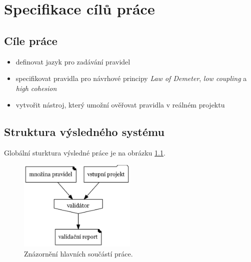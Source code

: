 \chapter{Specifikace cílů práce}


\section{Cíle práce}
\begin{itemize}
\item definovat jazyk pro zadávání pravidel
\item specifikovat pravidla pro návrhové principy \emph{Law of Demeter}, \emph{low coupling} a \emph{high cohesion}
\item vytvořit nástroj, který umožní ověřovat pravidla v reálném projektu
\end{itemize}

\section{Struktura výsledného systému}
Globální sturktura výsledné práce je na obrázku \ref{global_structure}.

\begin{figure}[h!]
  \centering
  \includegraphics[width=0.5\textwidth]{./graphs/global_structure.png}
  \caption{Znázornění hlavních součástí práce.\label{global_structure}}
\end{figure}

